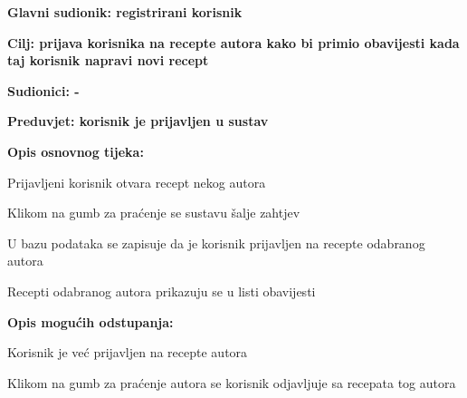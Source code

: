 					\noindent {}
					\begin{packed_item}
						\item \textbf{Glavni sudionik: registrirani korisnik}
						\item  \textbf{Cilj: prijava korisnika na recepte autora kako bi primio obavijesti kada taj korisnik napravi novi recept}
						\item  \textbf{Sudionici: -}
						\item  \textbf{Preduvjet: korisnik je prijavljen u sustav}
						
						\item  \textbf{Opis osnovnog tijeka:}
						\item[] \begin{packed_enum}
							\item Prijavljeni korisnik otvara recept nekog autora
							\item Klikom na gumb za praćenje se sustavu šalje zahtjev
							\item U bazu podataka se zapisuje da je korisnik prijavljen na recepte odabranog autora
							\item Recepti odabranog autora prikazuju se u listi obavijesti
						\end{packed_enum}
						
						\item  \textbf{Opis mogućih odstupanja:}
						\item[] \begin{packed_item}							
							\item[3.a] Korisnik je već prijavljen na recepte autora
							\begin{packed_enum}
								\item Klikom na gumb za praćenje autora se korisnik odjavljuje sa recepata tog autora
							\end{packed_enum}
						\end{packed_item}
					\end{packed_item}
				
				
				
